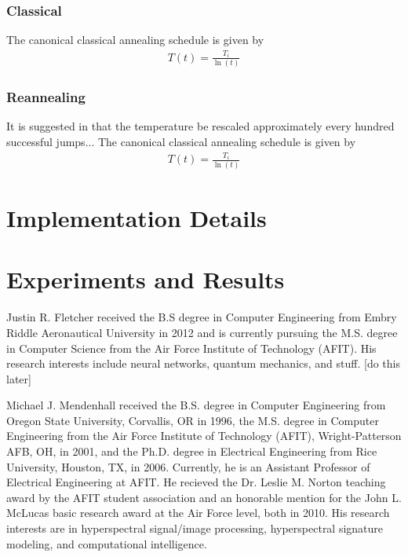 \documentclass[10pt,journal,cspaper,compsoc]{IEEEtran}
\begin{document}
\subsubsection{Classical}
The canonical classical annealing schedule is given by  
\begin{align}
	T(t) = \frac{T_i}{\ln(t)}
\end{align}

\subsubsection{Reannealing}
It is suggested in \cite{ingber1989veryfastsimulatedreannealing} that the temperature be rescaled approximately every hundred successful jumps... The canonical classical annealing schedule is given by  
\begin{align}
T(t) = \frac{T_i}{\ln(t)}
\end{align}


\section{Implementation Details}
\label{scn:implementation_details}


\section{Experiments and Results}
\label{scn:experiments_results}







\begin{IEEEbiography} {Justin R. Fletcher} %
received the B.S degree in Computer Engineering from Embry Riddle Aeronautical University in 2012 and is currently pursuing the M.S. degree in Computer Science from the Air Force Institute of Technology (AFIT). His research interests include neural networks, quantum mechanics, and stuff. [do this later]
\end{IEEEbiography}


\begin{IEEEbiography}{Michael J. Mendenhall} %
	received the B.S. degree in Computer Engineering from Oregon State University, Corvallis, OR in 1996, the M.S. degree in Computer Engineering 
	from the Air Force Institute of Technology (AFIT), Wright-Patterson AFB, OH, in 2001, and the Ph.D. degree in Electrical Engineering from Rice 
	University, Houston, TX, in 2006. Currently, he is an Assistant Professor of Electrical Engineering at AFIT. He recieved the Dr. Leslie M. Norton 
	teaching award by the AFIT student association and an honorable mention for the John L. McLucas basic research award at the Air Force level, 
	both in 2010.  His research interests are in hyperspectral signal/image processing, hyperspectral signature modeling, and computational intelligence.  
\end{IEEEbiography}
\end{document}
